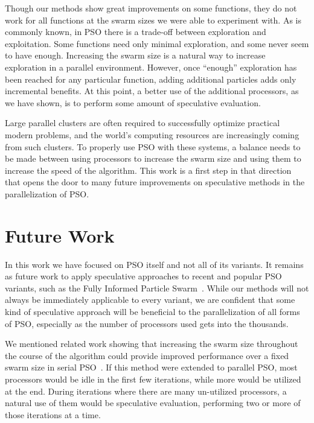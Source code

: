 \documentclass[smallcondensed]{svjour3}
\begin{document}
Though our methods show great improvements on some functions, they do not work
for all functions at the swarm sizes we were able to experiment with.  As is
commonly known, in PSO there is a trade-off between exploration and
exploitation.  Some functions need only minimal exploration, and some never
seem to have enough.  Increasing the swarm size is a natural way to increase
exploration in a parallel environment.  However, once ``enough'' exploration
has been reached for any particular function, adding additional particles adds
only incremental benefits.  At this point, a better use of the additional
processors, as we have shown, is to perform some amount of speculative
evaluation.

Large parallel clusters are often required to successfully optimize practical
modern problems, and the world's computing resources are increasingly coming
from such clusters.  To properly use PSO with these systems, a balance needs to
be made between using processors to increase the swarm size and using them to
increase the speed of the algorithm.  This work is a first step in that
direction that opens the door to many future improvements on speculative
methods in the parallelization of PSO.

\section{Future Work}
\label{sec:future}

In this work we have focused on PSO itself and not all of its variants.  It
remains as future work to apply speculative approaches to recent and popular
PSO variants, such as the Fully Informed Particle
Swarm~\citep{mendes-2004-fully-informed-particle-swarm}.  While our methods
will not always be immediately applicable to every variant, we are confident
that some kind of speculative approach will be beneficial to the
parallelization of all forms of PSO, especially as the number of processors
used gets into the thousands.

We mentioned related work showing that increasing the swarm size throughout the
course of the algorithm could provide improved performance over a fixed swarm
size in serial PSO~\citep{montes-de-oca-2011-incremental-social-learning-pso}.
If this method were extended to parallel PSO, most processors would be idle in
the first few iterations, while more would be utilized at the end.  During
iterations where there are many un-utilized processors, a natural use of them
would be speculative evaluation, performing two or more of those iterations at
a time.
\end{document}
